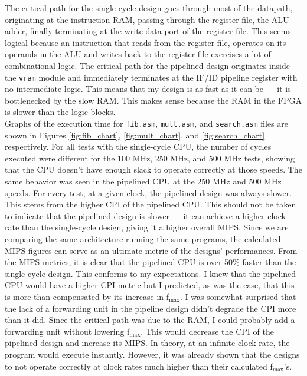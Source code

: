 \documentclass[12pt]{article}
\begin{document}
The critical path for the single-cycle design goes through most of the datapath, originating at the instruction RAM, passing through the register file, the ALU adder, finally terminating at the write data port of the register file. This seems logical because an instruction that reads from the register file, operates on its operands in the ALU and writes back to the register file exercises a lot of combinational logic. The critical path for the pipelined design originates inside the \texttt{vram} module and immediately terminates at the IF/ID pipeline register with no intermediate logic. This means that my design is as fast as it can be --- it is bottlenecked by the slow RAM. This makes sense because the RAM in the FPGA is slower than the logic blocks.\\

Graphs of the execution time for \texttt{fib.asm}, \texttt{mult.asm}, and \texttt{search.asm} files are shown in Figures \ref{fig:fib_chart}, \ref{fig:mult_chart}, and \ref{fig:search_chart} respectively. For all tests with the single-cycle CPU, the number of cycles executed were different for the 100 MHz, 250 MHz, and 500 MHz tests, showing that the CPU doesn't have enough slack to operate correctly at those speeds. The same behavior was seen in the pipelined CPU at the 250 MHz and 500 MHz speeds. For every test, at a given clock, the pipelined design was always slower. This stems from the higher CPI of the pipelined CPU. This should not be taken to indicate that the pipelined design is slower --- it can achieve a higher clock rate than the single-cycle design, giving it a higher overall MIPS. Since we are comparing the same architecture running the same programs, the calculated MIPS figures can serve as an ultimate metric of the designs' performances. From the MIPS metrics, it is clear that the pipelined CPU is over 50\% faster than the single-cycle design. This conforms to my expectations. I knew that the pipelined CPU would have a higher CPI metric but I predicted, as was the case, that this is more than compensated by its increase in f$_{\textrm{max}}$. I was somewhat surprised that the lack of a forwarding unit in the pipeline design didn't degrade the CPI more than it did. Since the critical path was due to the RAM, I could probably add a forwarding unit without lowering f$_{\textrm{max}}$. This would decrease the CPI of the pipelined design and increase its MIPS. In theory, at an infinite clock rate, the program would execute instantly. However, it was already shown that the designs to not operate correctly at clock rates much higher than their calculated f$_{\textrm{max}}$'s.\\
\end{document}
